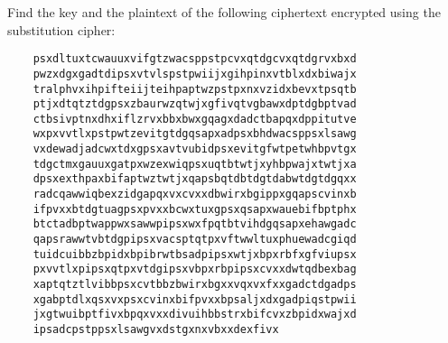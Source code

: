   Find the key and the plaintext of the following ciphertext
  encrypted using the substitution cipher:
  \begin{Verbatim}
    psxdltuxtcwauuxvifgtzwacsppstpcvxqtdgcvxqtdgrvxbxd
    pwzxdgxgadtdipsxvtvlspstpwiijxgihpinxvtblxdxbiwajx
    tralphvxihpifteiijteihpaptwzpstpxnxvzidxbevxtpsqtb
    ptjxdtqtztdgpsxzbaurwzqtwjxgfivqtvgbawxdptdgbptvad
    ctbsivptnxdhxiflzrvxbbxbwxgqagxdadctbapqxdppitutve
    wxpxvvtlxpstpwtzevitgtdgqsapxadpsxbhdwacsppsxlsawg
    vxdewadjadcwxtdxgpsxavtvubidpsxevitgfwtpetwhbpvtgx
    tdgctmxgauuxgatpxwzexwiqpsxuqtbtwtjxyhbpwajxtwtjxa
    dpsxexthpaxbifaptwztwtjxqapsbqtdbtdgtdabwtdgtdgqxx
    radcqawwiqbexzidgapqxvxcvxxdbwirxbgippxgqapscvinxb
    ifpvxxbtdgtuagpsxpvxxbcwxtuxgpsxqsapxwauebifbptphx
    btctadbptwappwxsawwpipsxwxfpqtbtvihdgqsapxehawgadc
    qapsrawwtvbtdgpipsxvacsptqtpxvftwwltuxphuewadcgiqd
    tuidcuibbzbpidxbpibrwtbsadpipsxwtjxbpxrbfxgfviupsx
    pxvvtlxpipsxqtpxvtdgipsxvbpxrbpipsxcvxxdwtqdbexbag
    xaptqtztlvibbpsxcvtbbzbwirxbgxxvqxvxfxxgadctdgadps
    xgabptdlxqsxvxpsxcvinxbifpvxxbpsaljxdxgadpiqstpwii
    jxgtwuibptfivxbpqxvxxdivuihbbstrxbifcvxzbpidxwajxd
    ipsadcpstppsxlsawgvxdstgxnxvbxxdexfivx
  \end{Verbatim}

